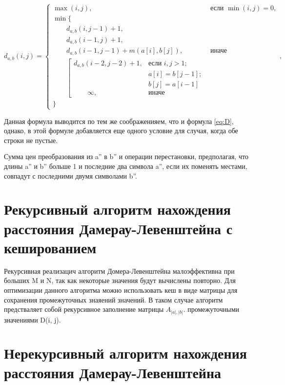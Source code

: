 \begin{equation}
    \label{eq:d}
    d_{a,b}(i, j) = \begin{cases}
        \max(i, j), &\text{если }\min(i, j) = 0,\\
        \min \lbrace \\
        \qquad d_{a,b}(i, j-1) + 1,\\
        \qquad d_{a,b}(i-1, j) + 1,\\
        \qquad d_{a,b}(i-1, j-1) + m(a[i], b[j]), &\text{иначе}\\
        \qquad \left[ \begin{array}{cc}d_{a,b}(i-2, j-2) + 1, &\text{если }i,j > 1;\\
        \qquad &\text{}a[i] = b[j-1]; \\
        \qquad &\text{}b[j] = a[i-1]\\
        \qquad \infty, & \text{иначе}\end{array}\right.\\
        \rbrace
    \end{cases},
\end{equation}

Данная формула выводится по тем же соображенияем, что и формула \ref{eq:D}, однако, 
в этой формуле добавляется еще одного условие для случая, когда обе строки не пустые. 

Сумма цен преобразования из a'' в b'' и операции перестановки, предполагая, что 
длины a'' и  b'' больше 1 и последние два символа a'', если их поменять местами, совпадут
с последними двумя символами b''.

\section{Рекурсивный алгоритм нахождения расстояния Дамерау-Левенштейна с кешированием}

Рекурсивная реализацич алгоритм Домера-Левенштейна малоэффективна при больших M и N, 
так как некоторые значения будут вычислены повторно. Для оптимизации данного алгоритма 
можно использовать кеш в виде матрицы для сохранения промежуточных знаяений значений.
В таком случае алгоритм предстваляет собой рекурсивное заполнение матрицы $A_{|a|,|b|}$.
промежуточными значениями D(i, j).

\section{Нерекурсивный алгоритм нахождения расстояния Дамерау-Левенштейна}

